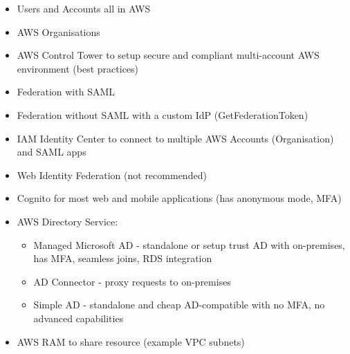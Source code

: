 \begin{itemize}
    \item Users and Accounts all in AWS
    \item AWS Organisations
    \item AWS Control Tower to setup secure and compliant multi-account AWS environment (best practices)
    \item Federation with SAML
    \item Federation without SAML with a custom IdP (GetFederationToken)
    \item IAM Identity Center to connect to multiple AWS Accounts (Organisation) and SAML apps
    \item Web Identity Federation (not recommended)
    \item Cognito for most web and mobile applications (has anonymous mode, MFA)
    \item AWS Directory Service:
    \begin{itemize}
        \item Managed Microsoft AD - standalone or setup trust AD with on-premises, has MFA, seamless joins, RDS integration
        \item AD Connector - proxy requests to on-premises
        \item Simple AD - standalone and cheap AD-compatible with no MFA, no advanced capabilities
    \end{itemize}
    \item AWS RAM to share resource (example VPC subnets)
\end{itemize}
